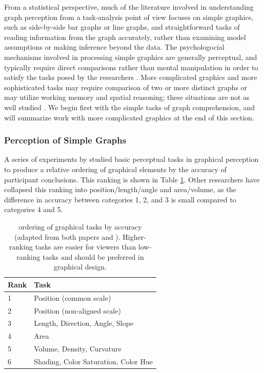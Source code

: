 \documentclass[11pt]{isuthesis}\usepackage[]{graphicx}\usepackage[]{color}
\begin{document}
From a statistical perspective, much of the literature involved in understanding graph perception from a task-analysis point of view focuses on simple graphics, such as side-by-side bar graphs or line graphs, and straightforward tasks of reading information from the graph accurately, rather than examining model assumptions or making inference beyond the data. The psychologocial mechanisms involved in processing simple graphics are generally perceptual, and typically require direct comparisons rather than mental manipulation in order to satisfy the tasks posed by the researchers \citep{trickett2006toward}. More complicated graphics and more sophisticated tasks may require comparison of two or more distinct graphs or may utilize working memory and spatial reasoning; these situations are not as well studied \citep{shah2005cambridge}. We begin first with the simple tasks of graph comprehension, and will summarize work with more complicated graphics at the end of this section. 

\subsubsection{Perception of Simple Graphs}
A series of experiments by \citet{cleveland:1984, cleveland:1985} studied basic perceptual tasks in graphical perception to produce a relative ordering of graphical elements by the accuracy of participant conclusions. This ranking is shown in Table \ref{clevelandranking}. Other researchers \citep{kosslyn1994} have collapsed this ranking into position/length/angle and area/volume, as the difference in accuracy between categories 1, 2, and 3 is small compared to categories 4 and 5. 
\begin{table}[htbp]\centering
\begin{tabular}{ll}
\hline
Rank & Task\\\hline
1 & Position (common scale)\\
2 & Position (non-aligned scale)\\
3 & Length, Direction, Angle, Slope\\
4 & Area \\
5 & Volume, Density, Curvature\\
6 & Shading, Color Saturation, Color Hue\\\hline
\end{tabular}
\caption[Cleveland \& McGill's ordering of graphical tasks]{\protect\citet{cleveland:1984, cleveland:1985} ordering of graphical tasks by accuracy (adapted from both papers and \protect\citealt{shah2005cambridge}). Higher-ranking tasks are easier for viewers than low-ranking tasks and should be preferred in graphical design.}\label{clevelandranking}
\end{table}
\end{document}
